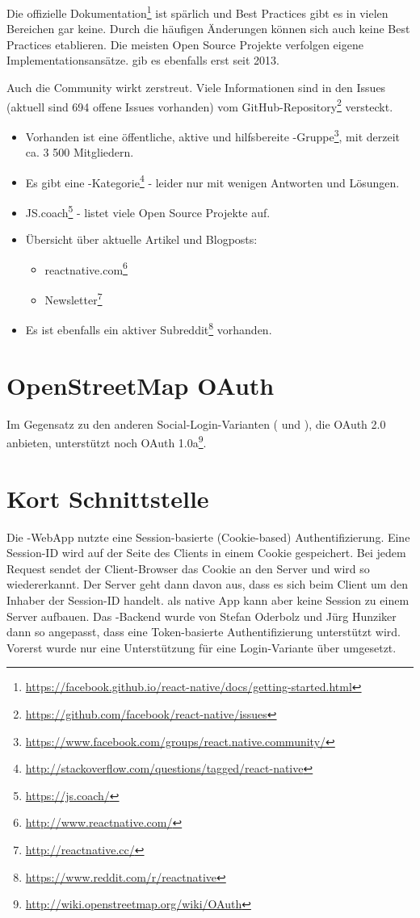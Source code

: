 Die offizielle Dokumentation\footnote{\url{https://facebook.github.io/react-native/docs/getting-started.html}} ist spärlich und Best Practices gibt es in vielen Bereichen gar keine.
Durch die häufigen Änderungen können sich auch keine Best Practices etablieren.
 Die meisten Open Source Projekte verfolgen eigene Implementationsansätze.
 gib es ebenfalls erst seit 2013.

Auch die Community wirkt zerstreut. 
Viele Informationen sind in den Issues (aktuell sind 694 offene Issues vorhanden) vom  GitHub-Repository\footnote{\url{https://github.com/facebook/react-native/issues}}  versteckt.


\begin{itemize}
	\item Vorhanden ist eine öffentliche, aktive und hilfsbereite -Gruppe\footnote{\url{https://www.facebook.com/groups/react.native.community/}}, mit derzeit ca. 3 500 Mitgliedern.
	\item Es gibt eine -Kategorie\footnote{\url{http://stackoverflow.com/questions/tagged/react-native}} - leider nur mit wenigen Antworten und Lösungen.
	\item JS.coach\footnote{\url{https://js.coach/}} - listet viele Open Source Projekte auf.
	\item Übersicht über aktuelle Artikel und Blogposts: 
	\begin{itemize}
		\item reactnative.com\footnote{\url{http://www.reactnative.com/}}
		\item {} Newsletter\footnote{\url{http://reactnative.cc/}}
	\end{itemize}
	\item Es ist ebenfalls ein aktiver Subreddit\footnote{\url{https://www.reddit.com/r/reactnative}} vorhanden.
\end{itemize}


\section{OpenStreetMap OAuth}
Im Gegensatz zu den anderen Social-Login-Varianten ( und ), die OAuth 2.0 anbieten, unterstützt  noch OAuth 1.0a\footnote{\url{http://wiki.openstreetmap.org/wiki/OAuth}}.


\section{Kort Schnittstelle}
Die \kort{}-\gls{WebApp} nutzte eine Session-basierte (Cookie-based) Authentifizierung.\cite{ba-kort-2012} 
Eine Session-ID wird auf der Seite des Clients in einem Cookie gespeichert. 
Bei jedem Request sendet der Client-Browser das Cookie an den Server und wird so wiedererkannt. 
Der Server geht dann davon aus, dass es sich beim Client um den Inhaber der Session-ID handelt. 
\kort{} als native App kann aber keine Session zu einem Server aufbauen.
Das \kort{}-Backend wurde von Stefan Oderbolz und Jürg Hunziker dann so angepasst, dass eine Token-basierte Authentifizierung unterstützt wird.
Vorerst wurde nur eine Unterstützung für eine Login-Variante über  umgesetzt.

